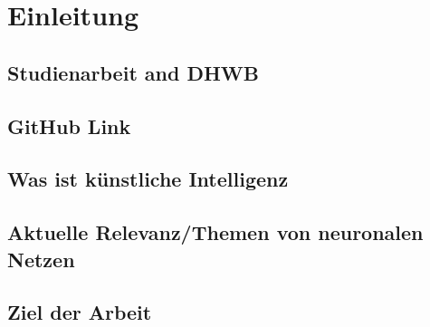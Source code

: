 \chapter{Einleitung}

\section{Studienarbeit and DHWB}

\section{GitHub Link}

\section{Was ist künstliche Intelligenz}

\section{Aktuelle Relevanz/Themen von neuronalen Netzen}

\section{Ziel der Arbeit}